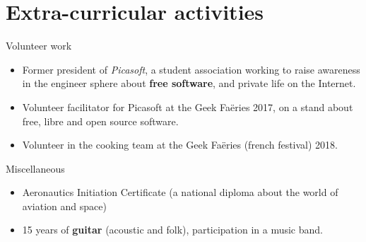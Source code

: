 \documentclass[a4paper]{twentysecondcv} %
\begin{document}
\section{Extra-curricular activities}
\begin{twenty}
    \twentyitem
    	{}
		{}
        {Volunteer work}
        {}
        {}
        {\begin{itemize}
        \item Former president of \textit{Picasoft}, a student association working to raise awareness in the engineer sphere about \textbf{free software}, and private life on the Internet.
        \item Volunteer facilitator for Picasoft at the Geek Faëries 2017, on a stand about free, libre and open source software.
        \item Volunteer in the cooking team at the Geek Faëries (french festival) 2018.
        \end{itemize}}
    \twentyitem
        {}
                {}
        {Miscellaneous}
        {}
        {}
        {\begin{itemize}
            \item Aeronautics Initiation Certificate (a national diploma about the world of aviation and space)
        \item 15 years of \textbf{guitar} (acoustic and folk), participation in a music band.
        \end{itemize}}
\end{twenty}
\end{document}
